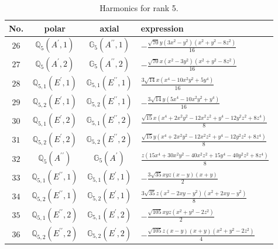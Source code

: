 \documentclass[fleqn,8pt,landscape]{jsarticle}
\begin{document}
\begin{table}[ht!]
\begin{center}
\caption{Harmonics for rank 5.}
\renewcommand{\arraystretch}{1.3}
\begin{tabular}{cccl} \hline \hline
No. & polar & axial & expression \\ \hline
$ 26 $ & $ \mathbb{Q}_{5}(A^{\prime},1) $ & $ \mathbb{G}_{5}(A^{\prime\prime},1) $ & $ - \frac{\sqrt{70} y \left(3 x^{2} - y^{2}\right) \left(x^{2} + y^{2} - 8 z^{2}\right)}{16} $ \\
$ 27 $ & $ \mathbb{Q}_{5}(A^{\prime},2) $ & $ \mathbb{G}_{5}(A^{\prime\prime},2) $ & $ - \frac{\sqrt{70} x \left(x^{2} - 3 y^{2}\right) \left(x^{2} + y^{2} - 8 z^{2}\right)}{16} $ \\
$ 28 $ & $ \mathbb{Q}_{5,1}(E^{\prime},1) $ & $ \mathbb{G}_{5,1}(E^{\prime\prime},1) $ & $ \frac{3 \sqrt{14} x \left(x^{4} - 10 x^{2} y^{2} + 5 y^{4}\right)}{16} $ \\
$ 29 $ & $ \mathbb{Q}_{5,2}(E^{\prime},1) $ & $ \mathbb{G}_{5,2}(E^{\prime\prime},1) $ & $ - \frac{3 \sqrt{14} y \left(5 x^{4} - 10 x^{2} y^{2} + y^{4}\right)}{16} $ \\
$ 30 $ & $ \mathbb{Q}_{5,1}(E^{\prime},2) $ & $ \mathbb{G}_{5,1}(E^{\prime\prime},2) $ & $ \frac{\sqrt{15} x \left(x^{4} + 2 x^{2} y^{2} - 12 x^{2} z^{2} + y^{4} - 12 y^{2} z^{2} + 8 z^{4}\right)}{8} $ \\
$ 31 $ & $ \mathbb{Q}_{5,2}(E^{\prime},2) $ & $ \mathbb{G}_{5,2}(E^{\prime\prime},2) $ & $ \frac{\sqrt{15} y \left(x^{4} + 2 x^{2} y^{2} - 12 x^{2} z^{2} + y^{4} - 12 y^{2} z^{2} + 8 z^{4}\right)}{8} $ \\
$ 32 $ & $ \mathbb{Q}_{5}(A^{\prime\prime}) $ & $ \mathbb{G}_{5}(A^{\prime}) $ & $ \frac{z \left(15 x^{4} + 30 x^{2} y^{2} - 40 x^{2} z^{2} + 15 y^{4} - 40 y^{2} z^{2} + 8 z^{4}\right)}{8} $ \\
$ 33 $ & $ \mathbb{Q}_{5,1}(E^{\prime\prime},1) $ & $ \mathbb{G}_{5,1}(E^{\prime},1) $ & $ - \frac{3 \sqrt{35} x y z \left(x - y\right) \left(x + y\right)}{2} $ \\
$ 34 $ & $ \mathbb{Q}_{5,2}(E^{\prime\prime},1) $ & $ \mathbb{G}_{5,2}(E^{\prime},1) $ & $ \frac{3 \sqrt{35} z \left(x^{2} - 2 x y - y^{2}\right) \left(x^{2} + 2 x y - y^{2}\right)}{8} $ \\
$ 35 $ & $ \mathbb{Q}_{5,1}(E^{\prime\prime},2) $ & $ \mathbb{G}_{5,1}(E^{\prime},2) $ & $ - \frac{\sqrt{105} x y z \left(x^{2} + y^{2} - 2 z^{2}\right)}{2} $ \\
$ 36 $ & $ \mathbb{Q}_{5,2}(E^{\prime\prime},2) $ & $ \mathbb{G}_{5,2}(E^{\prime},2) $ & $ - \frac{\sqrt{105} z \left(x - y\right) \left(x + y\right) \left(x^{2} + y^{2} - 2 z^{2}\right)}{4} $ \\
 \hline \hline
\end{tabular}
\end{center}
\end{table}
\end{document}
